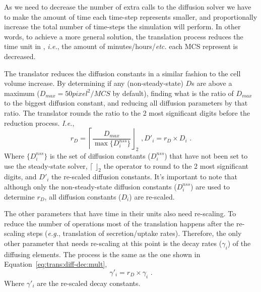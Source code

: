 As we need to decrease the number of extra calls to the diffusion solver we have to make the amount of time each time-step represents smaller, and proportionally increase the total number of time-steps the simulation will perform. In other words, to achieve a more general solution, the translation process reduces the time unit in \ccd, \textit{i.e.}, the amount of minutes/hours/\textit{etc.} each MCS represent is decreased. 

The translator reduces the diffusion constants in a similar fashion to the cell volume increase. By determining if any (non-steady-state) $D$s are above a maximum ($D_{max} = 50 pixel^2/MCS$ by default), finding what is the ratio of $D_{max}$ to the biggest diffusion constant, and reducing all diffusion parameters by that ratio. The translator rounds the ratio to the 2 most significant digits before the reduction process. \textit{I.e.},
\begin{subequations}\label{eq:trans:diff-dec}
    \begin{equation}\label{eq:trans:diff-dec:ratio}
        r_D = \left\lceil \frac{D_{max}}{\max\{D^{nss}_i\}} \right\rfloor_2\,\,,
    \end{equation}
    \begin{equation}\label{eq:trans:diff-dec:mult}
        D'_i = r_D \times D_i\,\,.
    \end{equation}
\end{subequations}
\noindent Where $\{D^{nss}_i\}$ is the set of diffusion constants ($D^{nss}_i$) that have not been set to use the steady-state solver, $\lceil\,\,\rfloor_2$ the operator to round to the 2 most significant digits, and $D'_i$ the re-scaled diffusion constants. It's important to note that although only the non-steady-state diffusion constants ($D^{nss}_i$) are used to determine $r_D$, all diffusion constants ($D_i$) are re-scaled. 

The other parameters that have time in their units also need re-scaling. To reduce the number of operations most of the translation happens after the re-scaling steps (\textit{e.g.}, translation of secretion/uptake rates). Therefore, the only other parameter that needs re-scaling at this point is the decay rates ($\gamma_i$) of the diffusing elements. The process is the same as the one shown in Equation~\ref{eq:trans:diff-dec:mult}, 
\begin{equation}
    \gamma'_i = r_D \times \gamma_i\,\,.
\end{equation}
\noindent Where $\gamma'_i$ are the re-scaled decay constants. 

